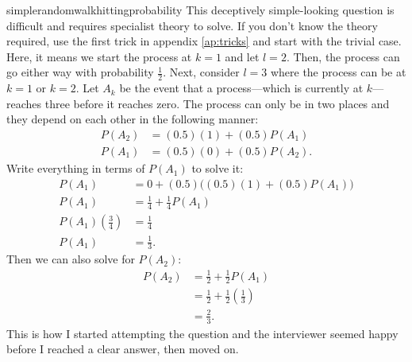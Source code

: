 \begin{answer}{simplerandomwalkhittingprobability}
This deceptively simple-looking question is difficult and requires specialist theory to solve.
If you don't know the theory required, use the first trick in appendix \ref{ap:tricks} and start with the trivial case.
Here, it means we start the process at $k=1$ and let $l=2$.
Then, the process can go either way with probability $\frac{1}{2}$.
Next, consider $l=3$ where the process can be at $k=1$ or $k=2$.
Let $A_k$ be the event that a process---which is currently at $k$---reaches three before it reaches zero.
The process can only be in two places and they depend on each other in the following manner:
\begin{align*}
P(A_2) &= (0.5)(1) + (0.5)P(A_1)  \\
P(A_1) &= (0.5)(0) + (0.5)P(A_2)
\text{.}
\end{align*}
Write everything in terms of $P(A_1)$ to solve it:
\begin{align*}
P(A_1) &= 0 + (0.5) \Big((0.5)(1) + (0.5) P(A_1)\Big) \\
P(A_1) &= \frac{1}{4} + \frac{1}{4}P(A_1) \\
P(A_1) \left(\frac{3}{4}\right)&= \frac{1}{4} \\
P(A_1) &= \frac{1}{3}
\text{.}
\end{align*}
Then we can also solve for $P(A_2)$:
\begin{align*}
P(A_2) &= \frac{1}{2} + \frac{1}{2} P(A_1)  \\
       &= \frac{1}{2} + \frac{1}{2}\left(\frac{1}{3}\right) \\
       &= \frac{2}{3}
\text{.}
\end{align*}
This is how I started attempting the question and the interviewer seemed happy before I reached a clear answer, then moved on.


\end{answer}
